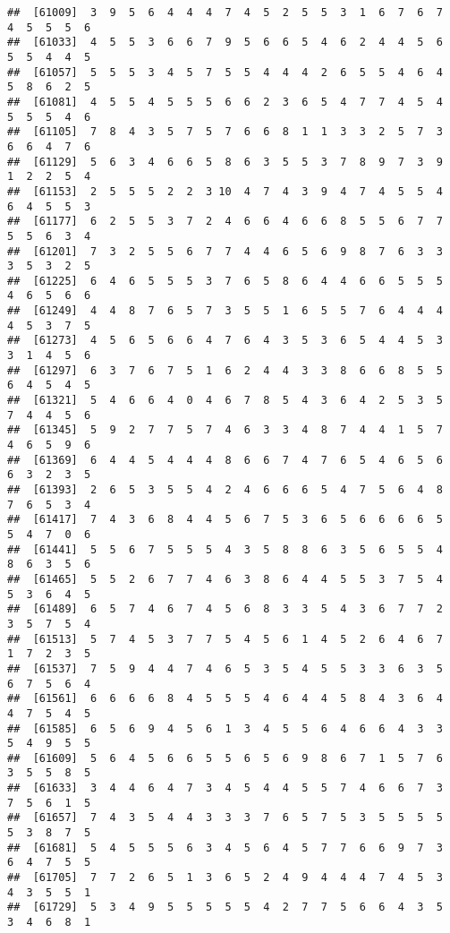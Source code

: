 \documentclass[
]{book}
\begin{document}
\begin{verbatim}
##  [61009]  3  9  5  6  4  4  4  7  4  5  2  5  5  3  1  6  7  6  7  4  5  5  5  6
##  [61033]  4  5  5  3  6  6  7  9  5  6  6  5  4  6  2  4  4  5  6  5  5  4  4  5
##  [61057]  5  5  5  3  4  5  7  5  5  4  4  4  2  6  5  5  4  6  4  5  8  6  2  5
##  [61081]  4  5  5  4  5  5  5  6  6  2  3  6  5  4  7  7  4  5  4  5  5  5  4  6
##  [61105]  7  8  4  3  5  7  5  7  6  6  8  1  1  3  3  2  5  7  3  6  6  4  7  6
##  [61129]  5  6  3  4  6  6  5  8  6  3  5  5  3  7  8  9  7  3  9  1  2  2  5  4
##  [61153]  2  5  5  5  2  2  3 10  4  7  4  3  9  4  7  4  5  5  4  6  4  5  5  3
##  [61177]  6  2  5  5  3  7  2  4  6  6  4  6  6  8  5  5  6  7  7  5  5  6  3  4
##  [61201]  7  3  2  5  5  6  7  7  4  4  6  5  6  9  8  7  6  3  3  3  5  3  2  5
##  [61225]  6  4  6  5  5  5  3  7  6  5  8  6  4  4  6  6  5  5  5  4  6  5  6  6
##  [61249]  4  4  8  7  6  5  7  3  5  5  1  6  5  5  7  6  4  4  4  4  5  3  7  5
##  [61273]  4  5  6  5  6  6  4  7  6  4  3  5  3  6  5  4  4  5  3  3  1  4  5  6
##  [61297]  6  3  7  6  7  5  1  6  2  4  4  3  3  8  6  6  8  5  5  6  4  5  4  5
##  [61321]  5  4  6  6  4  0  4  6  7  8  5  4  3  6  4  2  5  3  5  7  4  4  5  6
##  [61345]  5  9  2  7  7  5  7  4  6  3  3  4  8  7  4  4  1  5  7  4  6  5  9  6
##  [61369]  6  4  4  5  4  4  4  8  6  6  7  4  7  6  5  4  6  5  6  6  3  2  3  5
##  [61393]  2  6  5  3  5  5  4  2  4  6  6  6  5  4  7  5  6  4  8  7  6  5  3  4
##  [61417]  7  4  3  6  8  4  4  5  6  7  5  3  6  5  6  6  6  6  5  5  4  7  0  6
##  [61441]  5  5  6  7  5  5  5  4  3  5  8  8  6  3  5  6  5  5  4  8  6  3  5  6
##  [61465]  5  5  2  6  7  7  4  6  3  8  6  4  4  5  5  3  7  5  4  5  3  6  4  5
##  [61489]  6  5  7  4  6  7  4  5  6  8  3  3  5  4  3  6  7  7  2  3  5  7  5  4
##  [61513]  5  7  4  5  3  7  7  5  4  5  6  1  4  5  2  6  4  6  7  1  7  2  3  5
##  [61537]  7  5  9  4  4  7  4  6  5  3  5  4  5  5  3  3  6  3  5  6  7  5  6  4
##  [61561]  6  6  6  6  8  4  5  5  5  4  6  4  4  5  8  4  3  6  4  4  7  5  4  5
##  [61585]  6  5  6  9  4  5  6  1  3  4  5  5  6  4  6  6  4  3  3  5  4  9  5  5
##  [61609]  5  6  4  5  6  6  5  5  6  5  6  9  8  6  7  1  5  7  6  3  5  5  8  5
##  [61633]  3  4  4  6  4  7  3  4  5  4  4  5  5  7  4  6  6  7  3  7  5  6  1  5
##  [61657]  7  4  3  5  4  4  3  3  3  7  6  5  7  5  3  5  5  5  5  5  3  8  7  5
##  [61681]  5  4  5  5  5  6  3  4  5  6  4  5  7  7  6  6  9  7  3  6  4  7  5  5
##  [61705]  7  7  2  6  5  1  3  6  5  2  4  9  4  4  4  7  4  5  3  4  3  5  5  1
##  [61729]  5  3  4  9  5  5  5  5  5  4  2  7  7  5  6  6  4  3  5  3  4  6  8  1

\end{verbatim}
\end{document}
